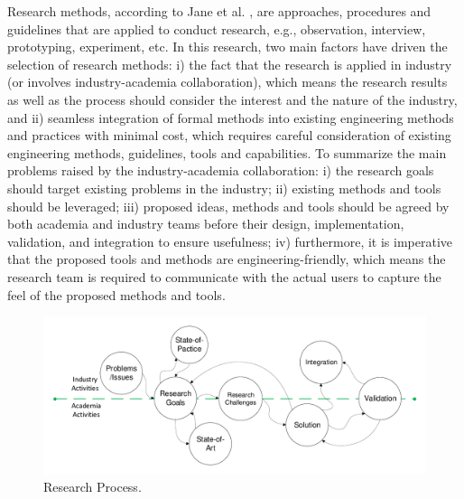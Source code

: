 \label{methods}
Research methods, according to Jane et al. \cite{qualitateiveresearch2012}, are approaches, procedures and guidelines that are applied to conduct research, e.g., observation, interview, prototyping, experiment, etc. In this research, two main factors have driven the selection of research methods: i) the fact that the research is applied in industry (or involves industry-academia collaboration), which means the research results as well as the process should consider the interest and the nature of the industry, and ii) seamless integration of formal methods into existing engineering methods and practices with minimal cost, which requires careful consideration of existing engineering methods, guidelines, tools and capabilities. To summarize the main problems raised by the industry-academia collaboration: i) the research goals should target existing problems in the industry; ii) existing methods and tools should be leveraged; iii) proposed ideas, methods and tools should be agreed by both academia and industry teams before their design, implementation, validation, and integration to ensure usefulness; iv) furthermore, it is imperative that the proposed tools and methods are engineering-friendly, which means the research team is required to communicate with the actual users to capture the feel of the proposed methods and tools. 
\begin{figure}[h]
\centering
  	\includegraphics[trim=10 0 10 0, clip,width=0.8\linewidth]{pics/research_process.pdf}
    \caption{Research Process.}
    \label{fig_research_process}
\end{figure}

